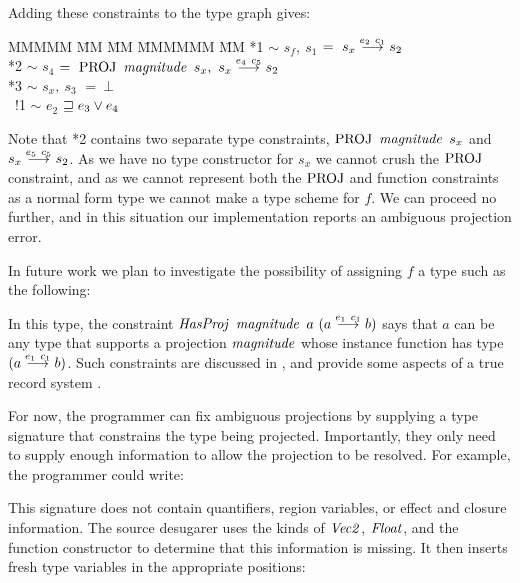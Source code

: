 \vspace{-10em}

Adding these constraints to the type graph gives:
\begin{tabbing}
MMMMM	\= MM 	\= MM 		\= MMMMMM 		\= MM \kill
	\> *1	\> $\sim$	\> $s_f, \ s_1$		\> $= \ s_x \stackrel{e_2 \ c_{1}}{\longrightarrow} s_2$ \\
	\> *2	\> $\sim$	\> $s_4$		\> $= \ \textrm{PROJ} \ \operatorname{\mathit{magnitude}} \ s_x, \
								s_x \stackrel{e_4 \ c_5}{\longrightarrow} s_2$ \\
	\> *3	\> $\sim$	\> $s_x, \ s_3$		\> $= \ \bot$ \\
	\> \ !1	\> $\sim$	\> $e_2$		\> $\sqsupseteq e_3 \lor e_4$
\end{tabbing}

Note that *2 contains two separate type constraints, $\textrm{PROJ} \ \operatorname{\mathit{magnitude}} \ s_x$ and $s_x \stackrel{e_5 \ c_5}{\longrightarrow} s_2$. As we have no type constructor for $s_x$ we cannot crush the $\textrm{PROJ}$ constraint, and as we cannot represent both the $\textrm{PROJ}$ and function constraints as a normal form type we cannot make a type scheme for $f$. We can proceed no further, and in this situation our implementation reports an ambiguous projection error.

In future work we plan to investigate the possibility of assigning $f$ a type such as the following:

\code{
	$f$ 	& $:: \forall a \ b \ e_1 \ c_1. \ a \lfuna{e_1 \ c_1} b$ \\
		& $\rhd \ \iHasProj \ \imagnitude \ a \ (a \lfuna{e_1 \ c_1} b)$
}

In this type, the constraint $\iHasProj \ \imagnitude \ a \ (a \lfuna{e_1 \ c_1} b)$ says that $a$ can be any type that supports a projection $\operatorname{\mathit{magnitude}}$ whose instance function has type $(a \stackrel{e_1 \ c_1}{\longrightarrow} b)$. Such constraints are discussed in \cite{leigen:qualified-types-for-MLF}, and provide some aspects of a true record system \cite{remy:type-inference-for-records}.

For now, the programmer can fix ambiguous projections by supplying a type signature that constrains the type being projected. Importantly, they only need to supply enough information to allow the projection to be resolved. For example, the programmer could write:


This signature does not contain quantifiers, region variables, or effect and closure information. The source desugarer uses the kinds of $\operatorname{\mathit{Vec2}}$, $\operatorname{\mathit{Float}}$, and the function constructor to determine that this information is missing. It then inserts fresh type variables in the appropriate positions:

